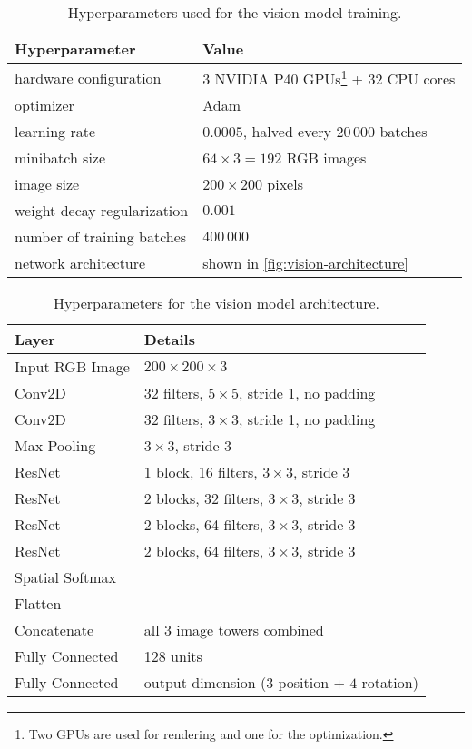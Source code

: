 \begin{table}[h!]
    \centering
    \footnotesize
    \caption{Hyperparameters used for the vision model training.}
    \renewcommand{\arraystretch}{1.3}
    \begin{tabular}{@{}ll@{}}
        \toprule
        \textbf{Hyperparameter} & \textbf{Value} \\ \midrule
        hardware configuration & 3 NVIDIA P40 GPUs\footnote{Two GPUs are used for rendering and one for the optimization.} + 32 CPU cores  \\
        optimizer & Adam~\citep{adam} \\
        learning rate & $0.0005$, halved every $20\,000$ batches \\
        minibatch size &  $64 \times 3 = 192$ RGB images \\
        image size & $200 \times 200$ pixels \\
        weight decay regularization & $0.001$ \\
        number of training batches & $400\,000$ \\
        network architecture & shown in \autoref{fig:vision-architecture} \\
    \bottomrule\end{tabular}
    \label{tbl:vision-hyp}
\end{table}




\begin{table}[h!]
    \centering
    \footnotesize
    \caption{Hyperparameters for the vision model architecture.}
    \begin{tabular}{@{}ll@{}}
        \toprule
        \textbf{Layer} & \textbf{Details} \\ \midrule
        Input RGB Image & $200\times200\times3$ \\
        Conv2D & 32 filters, $5\times5$, stride 1, no padding \\
        Conv2D & 32 filters, $3\times3$, stride 1, no padding \\
        Max Pooling & $3\times3$, stride 3 \\
        ResNet & 1 block, 16 filters,  $3\times3$, stride 3 \\
        ResNet & 2 blocks, 32 filters, $3\times3$, stride 3 \\
        ResNet & 2 blocks, 64 filters, $3\times3$, stride 3 \\
        ResNet & 2 blocks, 64 filters, $3\times3$, stride 3 \\
        Spatial Softmax & \\
        Flatten & \\
        Concatenate & all 3 image towers combined\\ \midrule
        Fully Connected & 128 units \\
        Fully Connected & output dimension ($3$ position + $4$ rotation) \\
    \bottomrule\end{tabular}
    \label{tbl:vision-hyper-arch}
\end{table}


 \FloatBarrier
